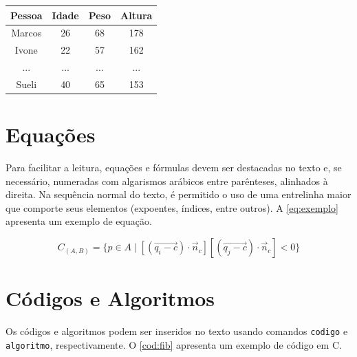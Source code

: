 \documentclass[12pt,oneside,a4paper,chapter=TITLE,section=TITLE,sumario
=tradicional]{abntex2}
\begin{document}
\begin{quadro}[htb]
    \begin{tabular}{|c||c|c|c|}
        \hline
        \textbf{Pessoa} & \textbf{Idade} & \textbf{Peso} & \textbf{Altura} \\ 
        \hline\hline
        Marcos & 26    & 68   & 178    \\ \hline
        Ivone  & 22    & 57   & 162    \\ \hline
        ...    & ...   & ...  & ...    \\ \hline
        Sueli  & 40    & 65   & 153    \\ \hline
    \end{tabular}
    
\end{quadro}

\section{Equações}
\label{sec:equações}

Para facilitar a leitura, equações e fórmulas devem ser destacadas no texto e, 
se necessário, numeradas com algarismos arábicos entre parênteses, alinhados à 
direita. Na sequência normal do texto, é permitido o uso de uma entrelinha 
maior que comporte seus elementos (expoentes, índices, entre outros). A 
\autoref{eq:exemplo} apresenta um exemplo de equação.

\begin{equation}
\label{eq:exemplo}
C_{(A,B)} = \{ p \in
A\;|\;[(\overrightarrow{q_i-c}){\cdot}{\vec{n}}_c][(\overrightarrow{q_j-c})
{\cdot}{\vec{n}}_c]
< 0 \}
\end{equation}

\section{Códigos e Algoritmos}
\label{sec:codigos}

Os códigos e algoritmos podem ser inseridos no texto usando comandos 
\texttt{codigo} e \texttt{algoritmo}, respectivamente. O \autoref{cod:fib} 
apresenta um exemplo de código em C.
\end{document}
